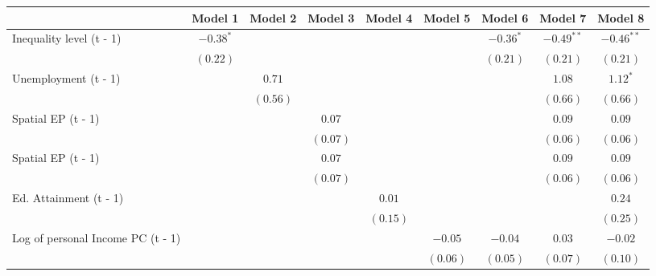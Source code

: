 
\begin{table}
\begin{center}
\begin{tabular}{l c c c c c c c c}
\hline
 & Model 1 & Model 2 & Model 3 & Model 4 & Model 5 & Model 6 & Model 7 & Model 8 \\
\hline
Inequality level (t - 1)          & $-0.38^{*}$  &              &              &              &              & $-0.36^{*}$  & $-0.49^{**}$ & $-0.46^{**}$ \\
                                  & $(0.22)$     &              &              &              &              & $(0.21)$     & $(0.21)$     & $(0.21)$     \\
Unemployment (t - 1)              &              & $0.71$       &              &              &              &              & $1.08$       & $1.12^{*}$   \\
                                  &              & $(0.56)$     &              &              &              &              & $(0.66)$     & $(0.66)$     \\
Spatial EP (t - 1)                &              &              & $0.07$       &              &              &              & $0.09$       & $0.09$       \\
                                  &              &              & $(0.07)$     &              &              &              & $(0.06)$     & $(0.06)$     \\
Spatial EP (t - 1)                &              &              & $0.07$       &              &              &              & $0.09$       & $0.09$       \\
                                  &              &              & $(0.07)$     &              &              &              & $(0.06)$     & $(0.06)$     \\
Ed. Attainment (t - 1)            &              &              &              & $0.01$       &              &              &              & $0.24$       \\
                                  &              &              &              & $(0.15)$     &              &              &              & $(0.25)$     \\
Log of personal Income PC (t - 1) &              &              &              &              & $-0.05$      & $-0.04$      & $0.03$       & $-0.02$      \\
                                  &              &              &              &              & $(0.06)$     & $(0.05)$     & $(0.07)$     & $(0.10)$     \\

\end{tabular}
\end{center}
\end{table}
